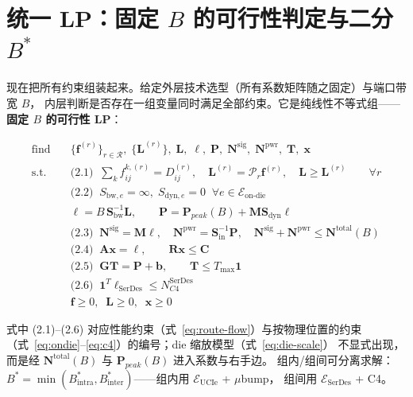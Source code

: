 \section{统一 LP：固定 $B$ 的可行性判定与二分 $B^*$}\label{sec:ov-unified}

现在把所有约束组装起来。给定外层技术选型（所有系数矩阵随之固定）与端口带宽 $B$，
内层判断是否存在一组变量同时满足全部约束。它是纯线性不等式组——\textbf{固定 $B$ 的可行性 LP}：

\begin{equation}\label{eq:unified-lp}
\boxed{
\begin{aligned}
\text{find} \quad & \{\mathbf{f}^{(r)}\}_{r\in\mathcal{R}},\; \{\mathbf{L}^{(r)}\},\; \mathbf{L},\; \boldsymbol{\ell},\; \mathbf{P},\; \mathbf{N}^{\text{sig}},\; \mathbf{N}^{\text{pwr}},\; \mathbf{T},\; \mathbf{x} \\[6pt]
\text{s.t.} \quad & \text{(2.1)}\;\; \textstyle\sum_k f_{ij}^{k,(r)} = D_{ij}^{(r)},\quad
\mathbf{L}^{(r)} = \mathcal{P}_r \mathbf{f}^{(r)},\quad
\mathbf{L} \ge \mathbf{L}^{(r)} \qquad \forall r \\[6pt]
& \text{(2.2)}\;\; S_{\text{bw},e}=\infty,\; S_{\text{dyn},e}=0 \;\; \forall e \in \mathcal{E}_{\text{on-die}} \\[6pt]
& \boldsymbol{\ell} = B\, \mathbf{S}_{\text{bw}}^{-1} \mathbf{L},\qquad
\mathbf{P} = \mathbf{P}_{peak}(B) + \mathbf{M}\mathbf{S}_{\text{dyn}}\boldsymbol{\ell} \\[6pt]
& \text{(2.3)}\;\; \mathbf{N}^{\text{sig}} = \mathbf{M}\boldsymbol{\ell},\quad
\mathbf{N}^{\text{pwr}} = \mathbf{S}_{\text{in}}^{-1}\mathbf{P},\quad
\mathbf{N}^{\text{sig}} + \mathbf{N}^{\text{pwr}} \le \mathbf{N}^{\text{total}}(B) \\[6pt]
& \text{(2.4)}\;\; \mathbf{A}\mathbf{x} = \boldsymbol{\ell},\qquad \mathbf{R}\mathbf{x} \le \mathbf{C} \\[6pt]
& \text{(2.5)}\;\; \mathbf{G}\mathbf{T} = \mathbf{P} + \mathbf{b},\qquad \mathbf{T} \le T_{\max}\mathbf{1} \\[6pt]
& \text{(2.6)}\;\; \mathbf{1}^T \boldsymbol{\ell}_{\text{SerDes}} \le N_{C4}^{\text{SerDes}} \\[6pt]
& \mathbf{f} \ge 0,\;\; \mathbf{L} \ge 0,\;\; \mathbf{x} \ge 0
\end{aligned}
}
\end{equation}

式中 (2.1)--(2.6) 对应性能约束（式~\eqref{eq:route-flow}）与按物理位置的约束
（式~\eqref{eq:ondie}--\eqref{eq:c4}）的编号；die 缩放模型（式~\eqref{eq:die-scale}）
不显式出现，而是经 $\mathbf{N}^{\text{total}}(B)$ 与 $\mathbf{P}_{peak}(B)$ 进入系数与右手边。
组内/组间可分离求解：$B^* = \min(B^*_{\text{intra}}, B^*_{\text{inter}})$——组内用 $\mathcal{E}_{\text{UCIe}}$ + $\mu$bump，
组间用 $\mathcal{E}_{\text{SerDes}}$ + C4。

